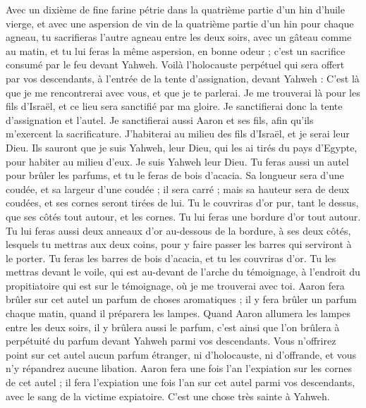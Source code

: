 \begin{multicols}{2}
Avec un dixième de fine farine pétrie dans la quatrième partie d'un hin d’huile vierge, et avec une aspersion de vin de la quatrième partie d'un hin pour chaque agneau,
tu sacrifieras l'autre agneau entre les deux soirs, avec un gâteau comme au matin, et tu lui feras la même aspersion, en bonne odeur ; c'est un sacrifice consumé par le feu devant Yahweh.
Voilà l’holocauste perpétuel qui sera offert par vos descendants, à l’entrée de la tente d’assignation, devant Yahweh : C’est là que je me rencontrerai avec vous, et que je te parlerai.
Je me trouverai là pour les fils d'Israël, et ce lieu sera sanctifié par ma gloire.
Je sanctifierai donc la tente d'assignation et l'autel. Je sanctifierai aussi Aaron et ses fils, afin qu'ils m'exercent la sacrificature.
J'habiterai au milieu des fils d'Israël, et je serai leur Dieu.
Ils sauront que je suis Yahweh, leur Dieu, qui les ai tirés du pays d'Egypte, pour habiter au milieu d'eux. Je suis Yahweh leur Dieu.
\VerseOne{}Tu feras aussi un autel pour brûler les parfums, et tu le feras de bois d’acacia.
Sa longueur sera d'une coudée, et sa largeur d'une coudée ; il sera carré ; mais sa hauteur sera de deux coudées, et ses cornes seront tirées de lui.
Tu le couvriras d’or pur, tant le dessus, que ses côtés tout autour, et les cornes. Tu lui feras une bordure d’or tout autour.
Tu lui feras aussi deux anneaux d'or au-dessous de la bordure, à ses deux côtés, lesquels tu mettras aux deux coins, pour y faire passer les barres qui serviront à le porter.
Tu feras les barres de bois d’acacia, et tu les couvriras d'or.
Tu les mettras devant le voile, qui est au-devant de l'arche du témoignage, à l'endroit du propitiatoire qui est sur le témoignage, où je me trouverai avec toi.
Aaron fera brûler sur cet autel un parfum de choses aromatiques ; il y fera brûler un parfum chaque matin, quand il préparera les lampes.
Quand Aaron allumera les lampes entre les deux soirs, il y brûlera aussi le parfum, c’est ainsi que l’on brûlera à perpétuité du parfum devant Yahweh parmi vos descendants.
Vous n'offrirez point sur cet autel aucun parfum étranger, ni d'holocauste, ni d'offrande, et vous n'y répandrez aucune libation.
Aaron fera une fois l'an l’expiation sur les cornes de cet autel ; il fera l’expiation une fois l'an sur cet autel parmi vos descendants, avec le sang de la victime expiatoire. C'est une chose très sainte à Yahweh.

\end{multicols}
